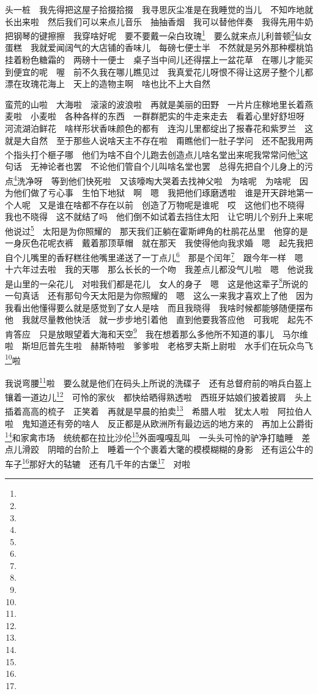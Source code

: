 \par 头一桩　我先得把这屋子拾掇拾掇　我寻思灰尘准是在我睡觉的当儿　不知咋地就长出来啦　然后我们可以来点儿音乐　抽抽香烟　我可以替他伴奏　我得先用牛奶把钢琴的键擦擦　我穿啥好呢　要不要戴一朵白玫瑰\footnote{}　要么就来点儿利普顿\footnote{}仙女蛋糕　我就爱闻阔气的大店铺的香味儿　每磅七便士半　不然就是另外那种樱桃馅挂着粉色糖霜的　两磅十一便士　桌子当中间儿还得摆上一盆花草　在哪儿才能买到便宜的呢　喔　前不久我在哪儿瞧见过　我真爱花儿呀恨不得让这房子整个儿都漂在玫瑰花海上　天上的造物主啊　啥也比不上大自然　
\par 蛮荒的山啦　大海啦　滚滚的波浪啦　再就是美丽的田野　一片片庄稼地里长着燕麦啦　小麦啦　各种各样的东西　一群群肥实的牛走来走去　看着心里好舒坦呀　河流湖泊鲜花　啥样形状香味颜色的都有　连沟儿里都绽出了报春花和紫罗兰　这就是大自然　至于那些人说啥天主不存在啦　甭瞧他们一肚子学问　还不配我用两个指头打个榧子哪　他们为啥不自个儿跑去创造点儿啥名堂出来呢我常常问他\footnote{}这句话　无神论者也罢　不论他们管自个儿叫啥名堂也罢　总得先把自个儿身上的污点\footnote{}洗净呀　等到他们快死啦　又该嚎啕大哭着去找神父啦　为啥呢　为啥呢　因为他们做了亏心事　生怕下地狱　啊　嗯　我把他们琢磨透啦　谁是开天辟地第一个人呢　又是谁在啥都不存在以前　创造了万物呢是谁呢　哎　这他们也不晓得　我也不晓得　这不就结了吗　他们倒不如试着去挡住太阳　让它明儿个别升上来呢　他说过\footnote{}　太阳是为你照耀的　那天我们正躺在霍斯岬角的杜鹃花丛里　他穿的是一身灰色花呢衣裤　戴着那顶草帽　就在那天　我使得他向我求婚　嗯　起先我把自个儿嘴里的香籽糕往他嘴里递送了一丁点儿\footnote{}　那是个闰年\footnote{}　跟今年一样　嗯　十六年过去啦　我的天哪　那么长长的一个吻　我差点儿都没气儿啦　嗯　他说我是山里的一朵花儿　对啦我们都是花儿　女人的身子　嗯　这是他这辈子\footnote{}所说的一句真话　还有那句今天太阳是为你照耀的　嗯　这么一来我才喜欢上了他　因为我看出他懂得要么就是感觉到了女人是啥　而且我晓得　我啥时候都能够随便摆布他　我就尽量教他快活　就一步步地引着他　直到他要我答应他　可我呢　起先不肯答应　只是放眼望着大海和天空\footnote{}　我在想着那么多他所不知道的事儿　马尔维啦　斯坦厄普先生啦　赫斯特啦　爹爹啦　老格罗夫斯上尉啦　水手们在玩众鸟飞\footnote{}啦　
\par 我说弯腰\footnote{}啦　要么就是他们在码头上所说的洗碟子　还有总督府前的哨兵白盔上镶着一道边儿\footnote{}　可怜的家伙　都快给晒得熟透啦　西班牙姑娘们披着披肩　头上插着高高的梳子　正笑着　再就是早晨的拍卖\footnote{}　希腊人啦　犹太人啦　阿拉伯人啦　鬼知道还有旁的啥人　反正都是从欧洲所有最边远的地方来的　再加上公爵街\footnote{}和家禽市场　统统都在拉比沙伦\footnote{}外面嘎嘎乱叫　一头头可怜的驴净打瞌睡　差点儿滑跤　阴暗的台阶上　睡着一个个裹着大氅的模模糊糊的身影　还有运公牛的车子\footnote{}那好大的轱辘　还有几千年的古堡\footnote{}　对啦　
